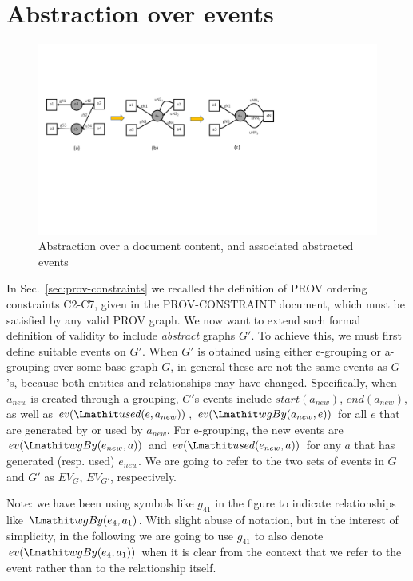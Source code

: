 
\section{Abstraction over events}
\label{sec:event}

\begin{figure}
	\centering
	\includegraphics[scale=.5]{cropped-reworked-e4-e5.pdf} 
	\caption{Abstraction over a document content, and associated abstracted events} \label{fig:e4-e5}
\end{figure}

In Sec.~\ref{sec:prov-constraints} we recalled the definition of PROV ordering  constraints C2-C7, given in the PROV-CONSTRAINT document, which must be satisfied by any valid PROV graph.
We now want to extend such formal definition of validity to include \textit{abstract} graphs $G'$. 
To achieve this, we must first define suitable events on $G'$. 
When $G'$ is obtained using either e-grouping or a-grouping over some base graph $G$,  in general these are not the same events as $G$'s, because both entities and relationships may have changed. 
Specifically, when $a_{new}$ is created through a-grouping, $G'$s events include 
 $start(a_{new})$, $end(a_{new})$, as well as 
$ev(\used(e, a_{new}))$, $ev(\wgby(a_{new}, e))$ for all $e$ that are generated by or used by $a_{new}$. 
For e-grouping, the new events are $ev(\wgby(e_{new}, a))$ and  $ev(\used(e_{new},a))$ for any $a$ that has generated (resp. used) $e_{new}$.
%
We are going to refer to the two sets of events in $G$ and $G'$ as $EV_{G}$, $EV_{G'}$, respectively.

Note: we have been using symbols like $g_{41}$ in the figure to indicate relationships like $\wgby(e_4, a_1)$. 
With slight abuse of notation, but in the interest of simplicity, in the following we are going to use $g_{41}$ to also denote $ev(\wgby(e_4, a_1))$ when it is clear from the context that we refer to the event rather than to the relationship itself.

